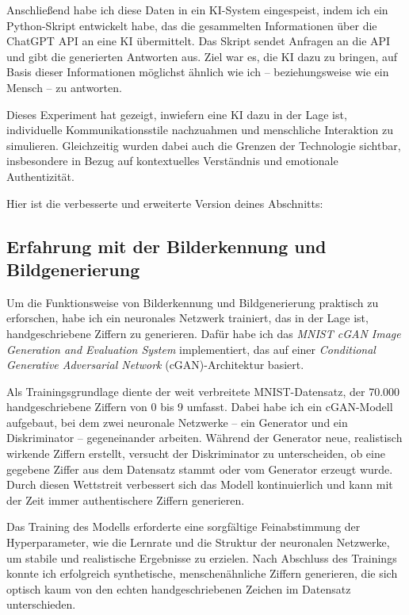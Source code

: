 \documentclass[a4paper,12pt]{article}
\begin{document}
Anschließend habe ich diese Daten in ein KI-System eingespeist, indem ich ein Python-Skript entwickelt habe, das die gesammelten Informationen über die ChatGPT API an eine KI übermittelt. Das Skript sendet Anfragen an die API und gibt die generierten Antworten aus. Ziel war es, die KI dazu zu bringen, auf Basis dieser Informationen möglichst ähnlich wie ich – beziehungsweise wie ein Mensch – zu antworten.

Dieses Experiment hat gezeigt, inwiefern eine KI dazu in der Lage ist, individuelle Kommunikationsstile nachzuahmen und menschliche Interaktion zu simulieren. Gleichzeitig wurden dabei auch die Grenzen der Technologie sichtbar, insbesondere in Bezug auf kontextuelles Verständnis und emotionale Authentizität.

Hier ist die verbesserte und erweiterte Version deines Abschnitts:

\subsection{Erfahrung mit der Bilderkennung und Bildgenerierung}

Um die Funktionsweise von Bilderkennung und Bildgenerierung praktisch zu erforschen, habe ich ein neuronales Netzwerk trainiert, das in der Lage ist, handgeschriebene Ziffern zu generieren. Dafür habe ich das \textit{MNIST cGAN Image Generation and Evaluation System} implementiert, das auf einer \textit{Conditional Generative Adversarial Network} (cGAN)-Architektur basiert.

Als Trainingsgrundlage diente der weit verbreitete MNIST-Datensatz, der 70.000 handgeschriebene Ziffern von 0 bis 9 umfasst. Dabei habe ich ein cGAN-Modell aufgebaut, bei dem zwei neuronale Netzwerke – ein Generator und ein Diskriminator – gegeneinander arbeiten. Während der Generator neue, realistisch wirkende Ziffern erstellt, versucht der Diskriminator zu unterscheiden, ob eine gegebene Ziffer aus dem Datensatz stammt oder vom Generator erzeugt wurde. Durch diesen Wettstreit verbessert sich das Modell kontinuierlich und kann mit der Zeit immer authentischere Ziffern generieren.

Das Training des Modells erforderte eine sorgfältige Feinabstimmung der Hyperparameter, wie die Lernrate und die Struktur der neuronalen Netzwerke, um stabile und realistische Ergebnisse zu erzielen. Nach Abschluss des Trainings konnte ich erfolgreich synthetische, menschenähnliche Ziffern generieren, die sich optisch kaum von den echten handgeschriebenen Zeichen im Datensatz unterschieden.
\end{document}
